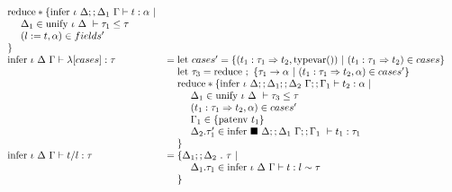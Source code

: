 \documentclass[sigplan,screen]{acmart}
\begin{document}
\begin{figure*}[h]
\[\begin{array}{l @{} l}
\begin{array}[t]{@{} l}
        \text{reduce} * \{
        \text{infer } \iota\ \Delta;;\Delta_1\ \Gamma \vdash t : \alpha\ |\ 
        \\
        \ \ \ \ \Delta_1 \in \text{unify } \iota\ \Delta\ \vdash \tau_1 \leq \tau
        \\
        \ \ \ \ (l := t, \alpha) \in fields'
        \\
        \}
        \\
      \end{array}
      \\

      \text{infer } \iota\ \Delta\ \Gamma \vdash 
      \lambda[ cases ] : \tau
      &{} =
      \begin{array}[t]{@{} l}
        \text{let } cases' = \{(t_1 : \tau_1 \Rightarrow t_2, \text{typevar}())\ |\ (t_1 : \tau_1 \Rightarrow t_2) \in cases \}
        \\
        \text{let } \tau_3 = \text{reduce } ;\ \{\tau_1 \rightarrow \alpha\ |\ (t_1 : \tau_1 \Rightarrow t_2, \alpha) \in cases' \}
        \\


        \text{reduce} * \{
        \text{infer } \iota\ \Delta;;\Delta_1;;\Delta_2\ \Gamma;;\Gamma_1 \vdash t_2 : \alpha\ |\ 
        \\
        \ \ \ \ \Delta_1 \in \text{unify } \iota\ \Delta\ \vdash \tau_3 \leq \tau
        \\
        \ \ \ \ (t_1 : \tau_1 \Rightarrow t_2, \alpha) \in cases'
        \\
        \ \ \ \ \Gamma_1 \in \{\text{patenv } t_1\}
        \\
        \ \ \ \ \Delta_2.\tau_1' \in \text{infer } \blacksquare\ \Delta;;\Delta_1\ \Gamma;;\Gamma_1\ \vdash t_1 : \tau_1
        \\
        \}
        \\
      \end{array}
      \\

      \text{infer } \iota\ \Delta\ \Gamma \vdash 
      t/l : \tau
      &{} =
      \begin{array}[t]{@{} l}
        \{ \Delta_1;;\Delta_2\ .\ \tau \ |\
        \\
        \ \ \ \ \Delta_1.\tau_1 \in \text{infer } \iota\ \Delta\ \Gamma \vdash t : l \sim \tau 
        \\
        \}
      \end{array}
      \\


\end{array}\]
\end{figure*}
\end{document}
